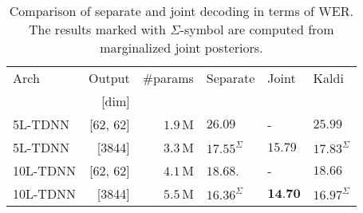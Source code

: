 \documentclass[a4paper]{article}
\begin{document}

\begin{table}[tb]
\centering
\caption{Comparison of separate and joint decoding in terms of WER. The results marked with $\Sigma$-symbol are computed from marginalized joint posteriors.}
\begin{tabular}{@{}lrr|ll|l@{}}
\toprule
Arch     & Output       & \#params   & Separate         & Joint & Kaldi\\
         & {[}dim{]}    &            &                  &       &      \\\midrule
5L-TDNN  & {[}62, 62{]} & $1.9$\,M   & $26.09$          & -     & $25.99$\\
5L-TDNN  & {[}3844{]}   & $3.3$\,M   & $17.55^\Sigma$   & $15.79$ & $17.83^\Sigma$\\
10L-TDNN & {[}62, 62{]} & $4.1$\,M   & $18.68$.         & -     & $18.66$\\
10L-TDNN & {[}3844{]}   & $5.5$\,M   & $16.36^\Sigma$   & $\textbf{14.70}$ & $16.97^\Sigma$\\
\bottomrule
\end{tabular}
\label{tab:main_results}
\end{table}
\end{document}
